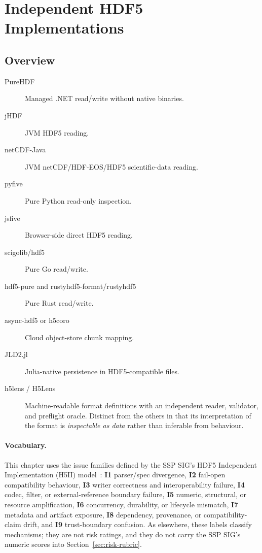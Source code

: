 \documentclass[../main.tex]{subfiles}
\begin{document}
\section{Independent HDF5 Implementations}
\label{sec:indie}

\subsection{Overview}

\begin{description}
    \item[PureHDF] Managed .NET read/write without native binaries.
    \item[jHDF] JVM HDF5 reading.
    \item[netCDF-Java] JVM netCDF/HDF-EOS/HDF5 scientific-data reading.
    \item[pyfive] Pure Python read-only inspection.
    \item[jsfive] Browser-side direct HDF5 reading.
    \item[scigolib/hdf5] Pure Go read/write.
    \item[hdf5-pure and rustyhdf5-format/rustyhdf5] Pure Rust read/write.
    \item[async-hdf5 or h5coro] Cloud object-store chunk mapping.
    \item[JLD2.jl] Julia-native persistence in HDF5-compatible files.
    \item[h5lens / H5Lens] Machine-readable format definitions with an
          independent reader, validator, and preflight oracle. Distinct from
          the others in that its interpretation of the format is
          \emph{inspectable as data} rather than inferable from behaviour.
\end{description}

\paragraph{Vocabulary.}
This chapter uses the issue families defined by the SSP SIG's HDF5 Independent
Implementation (H5II) model~\cite{hdf5-indie-model}: \textbf{I1} parser/spec
divergence, \textbf{I2} fail-open compatibility behaviour, \textbf{I3} writer
correctness and interoperability failure, \textbf{I4} codec, filter, or
external-reference boundary failure, \textbf{I5} numeric, structural, or
resource amplification, \textbf{I6} concurrency, durability, or lifecycle
mismatch, \textbf{I7} metadata and artifact exposure, \textbf{I8} dependency,
provenance, or compatibility-claim drift, and \textbf{I9} trust-boundary
confusion. As elsewhere, these labels classify mechanisms; they are not risk
ratings, and they do not carry the SSP SIG's numeric scores into
Section~\ref{sec:risk-rubric}.
\end{document}
